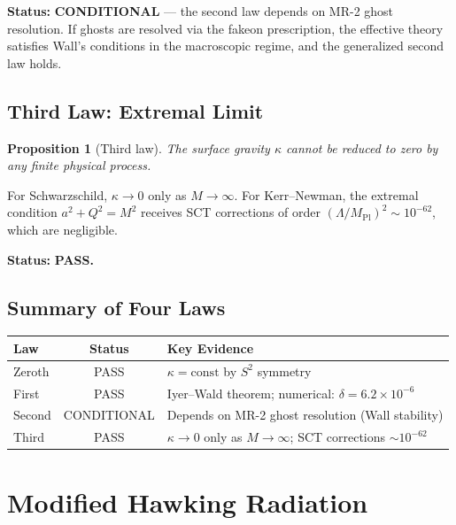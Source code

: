 \documentclass[11pt,a4paper]{article}
\theoremstyle{plain}
\newtheorem{proposition}[theorem]{Proposition}
\theoremstyle{definition}
\begin{document}
\noindent\textbf{Status:} \textcolor{orange!70!black}{\textbf{CONDITIONAL}}
--- the second law depends on MR-2 ghost resolution.
If ghosts are resolved via the fakeon prescription,
the effective theory satisfies Wall's conditions in the macroscopic
regime, and the generalized second law holds.

\subsection{Third Law: Extremal Limit}

\begin{proposition}[Third law]\label{prop:third}
The surface gravity $\kappa$ cannot be reduced to zero by any
finite physical process.
\end{proposition}

For Schwarzschild, $\kappa \to 0$ only as $M \to \infty$.
For Kerr--Newman, the extremal condition $a^2 + Q^2 = M^2$ receives
SCT corrections of order $(\Lambda/M_{\mathrm{Pl}})^2 \sim 10^{-62}$,
which are negligible.

\noindent\textbf{Status:} \textcolor{green!50!black}{\textbf{PASS.}}

\subsection{Summary of Four Laws}

\begin{center}
\begin{tabular}{lcl}
\toprule
Law & Status & Key Evidence \\
\midrule
Zeroth & \textcolor{green!50!black}{PASS} &
  $\kappa = \mathrm{const}$ by $S^2$ symmetry \\
First & \textcolor{green!50!black}{PASS} &
  Iyer--Wald theorem; numerical: $\delta = 6.2 \times 10^{-6}$ \\
Second & \textcolor{orange!70!black}{CONDITIONAL} &
  Depends on MR-2 ghost resolution (Wall stability) \\
Third & \textcolor{green!50!black}{PASS} &
  $\kappa \to 0$ only as $M \to \infty$; SCT corrections $\sim 10^{-62}$ \\
\bottomrule
\end{tabular}
\end{center}

\section{Modified Hawking Radiation}\label{sec:hawking}
\end{document}
